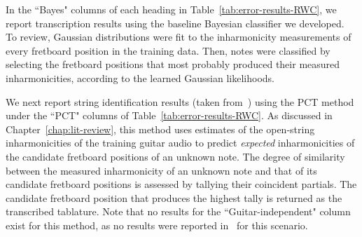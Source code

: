 \documentclass[12pt]{cmuthesis}
\begin{document}
In the ``Bayes" columns of each heading in Table~\ref{tab:error-results-RWC}, we report transcription results using the baseline Bayesian classifier we developed. To review, Gaussian distributions were fit to the inharmonicity measurements of every fretboard position in the training data. Then, notes were classified by selecting the fretboard positions that most probably produced their measured inharmonicities, according to the learned Gaussian likelihoods.

We next report string identification results (taken from~\cite{barbanchoi2012}) using the PCT method under the ``PCT" columns of Table~\ref{tab:error-results-RWC}. As discussed in Chapter~\ref{chap:lit-review}, this method uses estimates of the open-string inharmonicities of the training guitar audio to predict \textit{expected} inharmonicities of the candidate fretboard positions of an unknown note. The degree of similarity between the measured inharmonicity of an unknown note and that of its candidate fretboard positions is assessed by tallying their coincident partials. The candidate fretboard position that produces the highest tally is returned as the transcribed tablature. Note that no results for the ``Guitar-independent" column exist for this method, as no results were reported in~\cite{barbanchoi2012} for this scenario.

\end{document}
